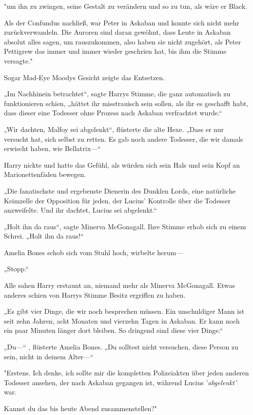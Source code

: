 {"um ihn zu zwingen, seine Gestalt zu verändern und so zu tun, als wäre er Black.

Als der Confundus nachließ, war Peter in Askaban und konnte sich nicht mehr zurückverwandeln. Die Auroren sind daran gewöhnt, dass Leute in Askaban absolut alles sagen, um rauszukommen, also haben sie nicht zugehört, als Peter Pettigrew das immer und immer wieder geschrien hat, bis ihm die Stimme versagte."

Sogar Mad-Eye Moodys Gesicht zeigte das Entsetzen.

„Im Nachhinein betrachtet“, sagte Harrys Stimme, die ganz automatisch zu funktionieren schien, „hättet ihr misstrauisch sein sollen, als ihr es geschafft habt, dass dieser eine Todesser ohne Prozess nach Askaban verfrachtet wurde.“

„Wir dachten, Malfoy sei abgelenkt“, flüsterte die alte Hexe. „Dass er nur versucht hat, sich selbst zu retten. Es gab noch andere Todesser, die wir damals erwischt haben, wie Bellatrix—“

Harry nickte und hatte das Gefühl, als würden sich sein Hals und sein Kopf an Marionettenfäden bewegen.

„Die fanatischste und ergebenste Dienerin des Dunklen Lords, eine natürliche Keimzelle der Opposition für jeden, der Lucius' Kontrolle über die Todesser anzweifelte. Und ihr dachtet, Lucius sei abgelenkt.“

„Holt ihn da raus“, sagte Minerva McGonagall. Ihre Stimme erhob sich zu einem Schrei. „Holt ihn da raus!“

Amelia Bones schob sich vom Stuhl hoch, wirbelte herum—

„Stopp.“

Alle sahen Harry erstaunt an, niemand mehr als Minerva McGonagall. Etwas anderes schien von Harrys Stimme Besitz ergriffen zu haben.

„Es gibt vier Dinge, die wir noch besprechen müssen. Ein unschuldiger Mann ist seit zehn Jahren, acht Monaten und vierzehn Tagen in Askaban. Er kann noch ein paar Minuten länger dort bleiben. So dringend sind diese vier Dinge.“

„Du—“ , flüsterte Amelia Bones. „Du solltest nicht versuchen, diese Person zu sein, nicht in deinem Alter—“

"Erstens. Ich denke, ich sollte mir die kompletten Polizeiakten über jeden anderen Todesser ansehen, der nach Askaban gegangen ist, während Lucius '\emph{abgelenkt'} war.

Kannst du das bis heute Abend zusammenstellen?"

}
